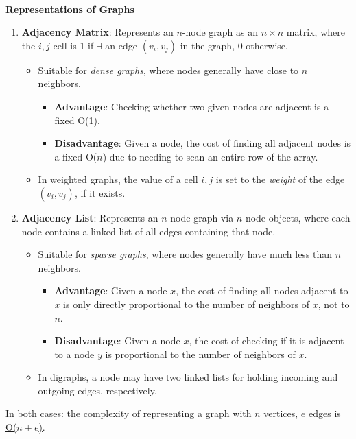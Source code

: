 \documentclass[12pt]{extarticle}
\theoremstyle{definition}
\theoremstyle{remark}
\begin{document}
~\\
\noindent\ul{\textbf{Representations of Graphs}}
\begin{enumerate}
    \item \textbf{Adjacency Matrix}: Represents an $n$-node graph as an $n\times n$ matrix, where the $i,j$ cell is 1 if $\exists$ an edge $(v_i,v_j)$ in the graph, 0 otherwise. \begin{itemize}
        \item Suitable for \textit{dense graphs}, where nodes generally have close to $n$ neighbors.\begin{itemize}
            \item \textbf{Advantage}: Checking whether two given nodes are adjacent is a fixed O(1). 
            \item\textbf{Disadvantage}: Given a node, the cost of finding all adjacent nodes is a fixed O($n$) due to needing to scan an entire row of the array.
        \end{itemize}
        \item In weighted graphs, the value of a cell $i,j$ is set to the \textit{weight} of the edge $(v_i,v_j)$, if it exists.
    \end{itemize}
    \item\textbf{Adjacency List}: Represents an $n$-node graph via $n$ node objects, where each node contains a linked list of all edges containing that node. \begin{itemize}
        \item Suitable for \textit{sparse graphs}, where nodes generally have much less than $n$ neighbors. \begin{itemize}
        \item\textbf{Advantage}: Given a node $x$, the cost of finding all nodes adjacent to $x$ is only directly proportional to the number of neighbors of $x$, not to $n$.
        \item\textbf{Disadvantage}: Given a node $x$, the cost of checking if it is adjacent to a node $y$ is proportional to the number of neighbors of $x$.
        \end{itemize}
        \item In digraphs, a node may have two linked lists for holding incoming and outgoing edges, respectively.
    \end{itemize}
\end{enumerate}

\noindent In both cases: the complexity of representing a graph with $n$ vertices, $e$ edges is \ul{O($n+e$)}.
\end{document}
